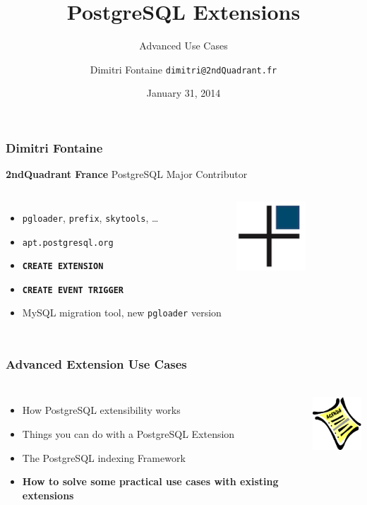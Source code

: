 \documentclass{beamer}
\title{PostgreSQL Extensions}
\subtitle{Advanced Use Cases}
\author{Dimitri Fontaine \texttt{dimitri@2ndQuadrant.fr}}
\date{January 31, 2014}
\begin{document}
\frame{\titlepage}

\begin{frame}[fragile]
  \frametitle{Dimitri Fontaine}

  \begin{center}
    \textbf{2ndQuadrant France}
    \linebreak
    PostgreSQL Major Contributor
  \end{center}
  \vfill

\begin{columns}[c]

  \begin{itemize}
   \item \texttt{pgloader}, \texttt{prefix}, \texttt{skytools}, …
   \item \texttt{apt.postgresql.org}
   \item \texttt{\textbf{CREATE EXTENSION}}
   \item \texttt{\textbf{CREATE EVENT TRIGGER}}
   \item MySQL migration tool, new \texttt{pgloader} version
  \end{itemize}  

\begin{center}
  \includegraphics[height=7em]{2ndQuadrant-cross.png}
\end{center}
\end{columns}
\end{frame}

\begin{frame}[fragile]
  \frametitle{Advanced Extension Use Cases}

  \vfill

\begin{columns}

  \begin{itemize}
  \item How PostgreSQL extensibility works
  \item Things you can do with a PostgreSQL Extension
  \item The PostgreSQL indexing Framework
  \item \textbf{How to solve some practical use cases with existing extensions}
  \end{itemize}

\begin{center}
  \includegraphics[height=6em]{agenda.jpg}
\end{center}
\end{columns}
\end{frame}
\end{document}
